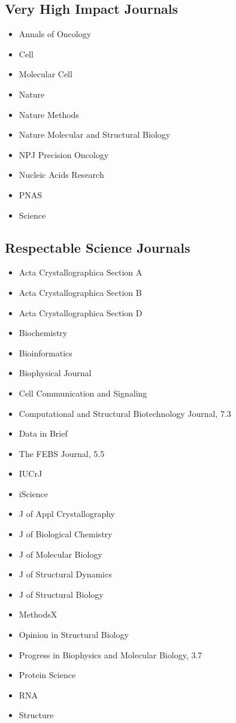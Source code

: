 \documentclass[10pt,letterpaper]{article}
\begin{document}
\subsection{Very High Impact Journals}

\begin{itemize}
  \item Annals of Oncology
  \item Cell
  \item Molecular Cell
  \item Nature
  \item Nature Methods
  \item Nature Molecular and Structural Biology
  \item NPJ Precision Oncology
  \item Nucleic Acids Research
  \item PNAS
  \item Science
\end{itemize}


\subsection{Respectable Science Journals}


\begin{itemize}
  \item Acta Crystallographica Section A
  \item Acta Crystallographica Section B
  \item Acta Crystallographica Section D
  \item Biochemistry
  \item Bioinformatics
  \item Biophysical Journal
  \item Cell Communication and Signaling
  \item Computational and Structural Biotechnology Journal, 7.3
  \item Data in Brief
  \item The FEBS Journal, 5.5
  \item IUCrJ
  \item iScience
  \item J of Appl Crystallography
  \item J of Biological Chemistry
  \item J of Molecular Biology
  \item J of Structural Dynamics
  \item J of Structural Biology
  \item MethodsX
  \item Opinion in Structural Biology
  \item Progress in Biophysics and Molecular Biology, 3.7
  \item Protein Science
  \item RNA
  \item Structure
\end{itemize}
\end{document}
